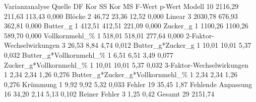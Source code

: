 Varianzanalyse
Quelle	DF	Kor SS	Kor MS	F-Wert	p-Wert
Modell	10	2116,29	211,63	113,43	0,000
  Blöcke	2	46,72	23,36	12,52	0,000
  Linear	3	2030,78	676,93	362,81	0,000
    Butter\_g	1	412,51	412,51	221,09	0,000
    Zucker\_g	1	1100,26	1100,26	589,70	0,000
    Vollkornmehl\_\%	1	518,01	518,01	277,64	0,000
  2-Faktor-Wechselwirkungen	3	26,53	8,84	4,74	0,012
    Butter\_g*Zucker\_g	1	10,01	10,01	5,37	0,032
    Butter\_g*Vollkornmehl\_\%	1	6,51	6,51	3,49	0,077
    Zucker\_g*Vollkornmehl\_\%	1	10,01	10,01	5,37	0,032
  3-Faktor-Wechselwirkungen	1	2,34	2,34	1,26	0,276
    Butter\_g*Zucker\_g*Vollkornmehl\_\%	1	2,34	2,34	1,26	0,276
  Krümmung	1	9,92	9,92	5,32	0,033
Fehler	19	35,45	1,87	 	 
  Fehlende Anpassung	16	34,20	2,14	5,13	0,102
    Reiner Fehler	3	1,25	0,42	 	 
Gesamt	29	2151,74	 	 	 
